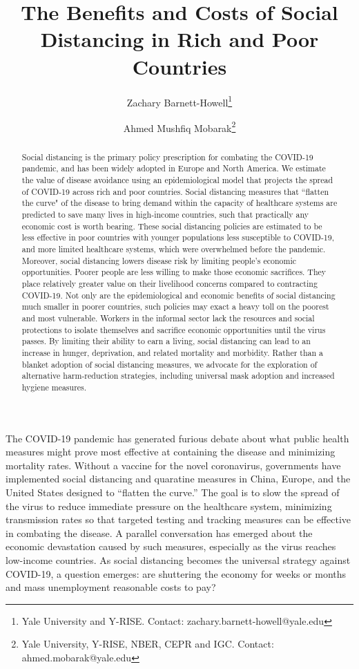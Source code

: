 \documentclass[11pt]{article}
\author{Zachary Barnett-Howell\thanks{Yale University and Y-RISE. Contact: zachary.barnett-howell@yale.edu} \and Ahmed Mushfiq Mobarak\thanks{Yale University, Y-RISE, NBER, CEPR and IGC. Contact: ahmed.mobarak@yale.edu} }
\title{The Benefits and Costs of Social Distancing in Rich and Poor Countries}
\begin{document}
\maketitle

\begin{abstract}
    
Social distancing is the primary policy prescription for combating the COVID-19 pandemic, and has been widely adopted in Europe and North America. We estimate the value of disease avoidance using an epidemiological model that projects the spread of COVID-19 across rich and poor countries. Social distancing measures that ``flatten the curve" of the disease to bring demand within the capacity of healthcare systems are predicted to save many lives in high-income countries, such that practically any economic cost is worth bearing. These social distancing policies are estimated to be less effective in poor countries with younger populations less susceptible to COVID-19, and more limited healthcare systems, which were overwhelmed before the pandemic. Moreover, social distancing lowers disease risk by limiting people's economic opportunities. Poorer people are less willing to make those economic sacrifices. They place relatively greater value on their livelihood concerns compared to contracting COVID-19. Not only are the epidemiological and economic benefits of social distancing much smaller in poorer countries, such policies may exact a heavy toll on the poorest and most vulnerable. Workers in the informal sector lack the resources and social protections to isolate themselves and sacrifice economic opportunities until the virus passes. By limiting their ability to earn a living, social distancing can lead to an increase in hunger, deprivation, and related mortality and morbidity. Rather than a blanket adoption of social distancing measures, we advocate for the exploration of alternative harm-reduction strategies, including universal mask adoption and increased hygiene measures.

\end{abstract}


\doublespacing

The COVID-19 pandemic has generated furious debate about what public health measures might prove most effective at containing the disease and minimizing mortality rates. Without a vaccine for the novel coronavirus, governments have implemented social distancing and quaratine measures in China, Europe, and the United States designed to ``flatten the curve.'' The goal is to slow the spread of the virus to reduce immediate pressure on the healthcare system, minimizing transmission rates so that targeted testing and tracking measures can be effective in combating the disease. A parallel conversation has emerged about the economic devastation caused by such measures, especially as the virus reaches low-income countries. As social distancing becomes the universal strategy against COVID-19, a question emerges: are shuttering the economy for weeks or months and mass unemployment reasonable costs to pay? 
\end{document}
